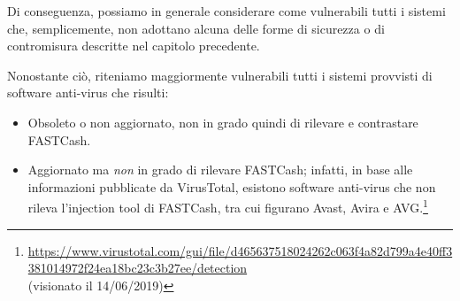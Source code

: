 \documentclass[10pt,a4paper, titlepage]{report}
\begin{document}
Di conseguenza, possiamo in generale considerare come vulnerabili tutti i sistemi che, semplicemente, non adottano alcuna delle forme di sicurezza o di contromisura descritte nel capitolo precedente.

Nonostante ciò, riteniamo maggiormente vulnerabili tutti i sistemi provvisti di software anti-virus che risulti: 
\begin{itemize}
\item Obsoleto o non aggiornato, non in grado quindi di rilevare e contrastare FASTCash.
\item Aggiornato ma \textit{non} in grado di rilevare FASTCash; infatti, in base alle informazioni pubblicate da VirusTotal, esistono software anti-virus che non rileva l'injection tool di FASTCash, tra cui figurano Avast, Avira e AVG.\footnote{\url{https://www.virustotal.com/gui/file/d465637518024262c063f4a82d799a4e40ff3381014972f24ea18bc23c3b27ee/detection} \\ (visionato il 14/06/2019)}
\end{itemize} 

\listoftables
\lstlistoflistings
\end{document}
